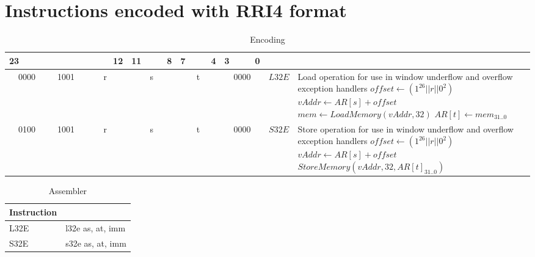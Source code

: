\section*{Instructions encoded with RRI4 format}
\begin{longtable}{llllllllllllllllllllllll  p{1cm}  p{7cm} | }
	\caption{Encoding\label{long}}\\
	23 & & & & & & & & & & & 12 & 11 & & & 8 & 7 & & & 4 & 3 & & & 0 & &
	\multicolumn{1}{c}{}\\
	\hline
	\multicolumn{4}{|c|}{0000} & \multicolumn{4}{c|}{1001} & \multicolumn{4}{c|}{r} & \multicolumn{4}{c|}{s} & \multicolumn{4}{c|}{t} & \multicolumn{4}{c|}{0000} & \multicolumn{1}{c|}{$L32E$} & Load operation for use in window underflow and overflow exception handlers \newline $offset \leftarrow (1^{26}||r||0^2)$ \newline $vAddr \leftarrow AR[s] + offset$ \newline $mem \leftarrow LoadMemory(vAddr, 32)$ \newline $AR[t] \leftarrow mem_{31..0}$ \\ \hline
	\multicolumn{4}{|c|}{0100} & \multicolumn{4}{c|}{1001} & \multicolumn{4}{c|}{r} & \multicolumn{4}{c|}{s} & \multicolumn{4}{c|}{t} & \multicolumn{4}{c|}{0000} & \multicolumn{1}{c|}{$S32E$} & Store operation for use in window underflow and overflow exception handlers \newline $offset \leftarrow (1^{26}||r||0^2)$ \newline $vAddr \leftarrow AR[s] + offset$ \newline $StoreMemory(vAddr, 32, AR[t]_{31..0})$ \\ \hline
\end{longtable}

\begin{longtable}{|p{5cm}|p{5cm}|}
	\caption{Assembler\label{long}}\\		
	\hline
	Instruction & \\
	\hline
	L32E & l32e as, at, imm\\ \hline
	S32E & s32e as, at, imm\\ \hline
\end{longtable}